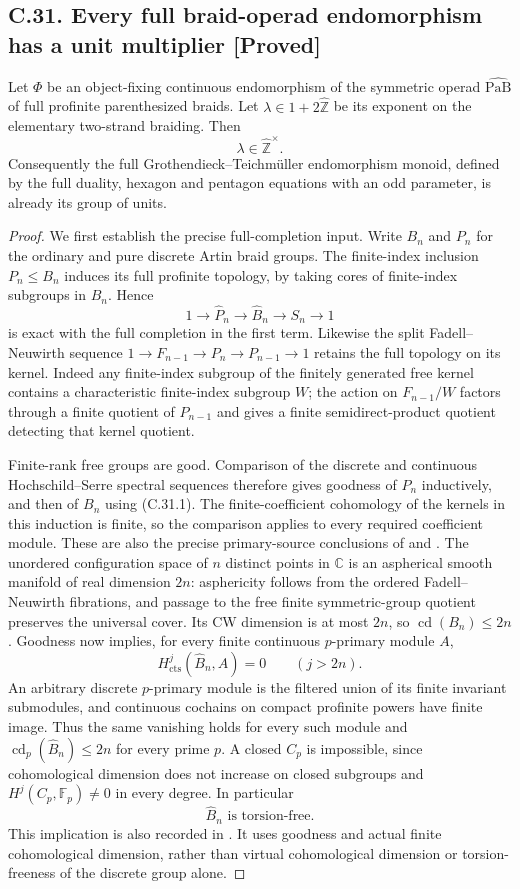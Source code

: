 \documentclass[11pt]{article}
\newcommand{\statement}[3]{\subsection*{#1. #3 [#2]}}
\begin{document}
\statement{C.31}{Proved}{Every full braid-operad endomorphism has a unit multiplier}
Let $\Phi$ be an object-fixing continuous endomorphism of the symmetric
operad $\widehat{\mathrm{PaB}}$ of full profinite parenthesized braids.
Let $\lambda\in1+2\widehat{\mathbb Z}$ be its exponent on the elementary
two-strand braiding. Then
\[
                         \lambda\in\widehat{\mathbb Z}^{\times}.
\]
Consequently the full Grothendieck--Teichm\"uller endomorphism monoid,
defined by the full duality, hexagon and pentagon equations with an odd
parameter, is already its group of units.

\begin{proof}
We first establish the precise full-completion input. Write $B_n$ and
$P_n$ for the ordinary and pure discrete Artin braid groups. The
finite-index inclusion $P_n\leq B_n$ induces its full profinite
topology, by taking cores of finite-index subgroups in $B_n$. Hence
\[
 1\longrightarrow\widehat P_n\longrightarrow\widehat B_n
       \longrightarrow S_n\longrightarrow1                     \tag{C.31.1}
\]
is exact with the full completion in the first term. Likewise the
split Fadell--Neuwirth sequence
$1\to F_{n-1}\to P_n\to P_{n-1}\to1$ retains the full topology on
its kernel. Indeed any finite-index subgroup of the finitely
generated free kernel contains a characteristic finite-index subgroup
$W$; the action on $F_{n-1}/W$ factors through a finite quotient of
$P_{n-1}$ and gives a finite semidirect-product quotient detecting
that kernel quotient.

Finite-rank free groups are good. Comparison of the discrete and
continuous Hochschild--Serre spectral sequences therefore gives
goodness of $P_n$ inductively, and then of $B_n$ using (C.31.1).
The finite-coefficient cohomology of the kernels in this induction is
finite, so the comparison applies to every required coefficient
module. These are also the precise primary-source conclusions of
\cite[Proposition 5.10 and Corollary 5.11]{CEHorel2017} and
\cite[\S2.3, Proposition 1]{CEMarin2012}.
The unordered configuration space of $n$ distinct points in
$\mathbb C$ is an aspherical smooth manifold of real dimension $2n$:
asphericity follows from the ordered Fadell--Neuwirth fibrations,
and passage to the free finite symmetric-group quotient preserves
the universal cover. Its CW dimension is at most $2n$, so
$\operatorname{cd}(B_n)\leq2n$. Goodness now implies, for every
finite continuous $p$-primary module $A$,
\[
 H^j_{\mathrm{cts}}(\widehat B_n,A)=0\qquad(j>2n).
\]
An arbitrary discrete $p$-primary module is the filtered union of
its finite invariant submodules, and continuous cochains on compact
profinite powers have finite image. Thus the same vanishing holds
for every such module and
$\operatorname{cd}_p(\widehat B_n)\leq2n$ for every prime $p$.
A closed $C_p$ is impossible, since cohomological dimension does
not increase on closed subgroups and
$H^j(C_p,\mathbb F_p)\ne0$ in every degree. In particular
\[
                     \widehat B_n\text{ is torsion-free}.        \tag{C.31.2}
\]
This implication is also recorded in
\cite[Lemma 8.4]{CEMorales2024}. It uses goodness and actual finite
cohomological dimension, rather than virtual cohomological dimension
or torsion-freeness of the discrete group alone.


\end{proof}
\end{document}
